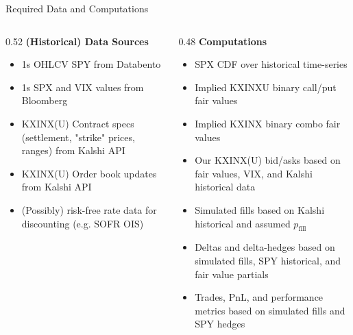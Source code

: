 \documentclass[aspectratio=169]{beamer}
\begin{document}
\begin{frame}{Required Data and Computations}
  \begin{columns}[T,onlytextwidth]
    \begin{column}{0.52\textwidth}
      \textbf{(Historical) Data Sources}
      \begin{itemize}
        \item 1s OHLCV SPY from Databento
        \item 1s SPX and VIX values from Bloomberg
        \item KXINX(U) Contract specs (settlement, "strike" prices, ranges) from Kalshi API
        \item KXINX(U) Order book updates from Kalshi API
        \item (Possibly) risk-free rate data for discounting (e.g. SOFR OIS)
      \end{itemize}
    \end{column}
    \begin{column}{0.48\textwidth}
      \textbf{Computations}
      \begin{itemize}
        \item SPX CDF over historical time-series
        \item Implied KXINXU binary call/put fair values
        \item Implied KXINX binary combo fair values
        \item Our KXINX(U) bid/asks based on fair values, VIX, and Kalshi historical data
        \item Simulated fills based on Kalshi historical and assumed $p_\text{fill}$
        \item Deltas and delta-hedges based on simulated fills, SPY historical, and fair value partials
        \item Trades, PnL, and performance metrics based on simulated fills and SPY hedges
      \end{itemize}
    \end{column}
  \end{columns}
\end{frame}
\end{document}
